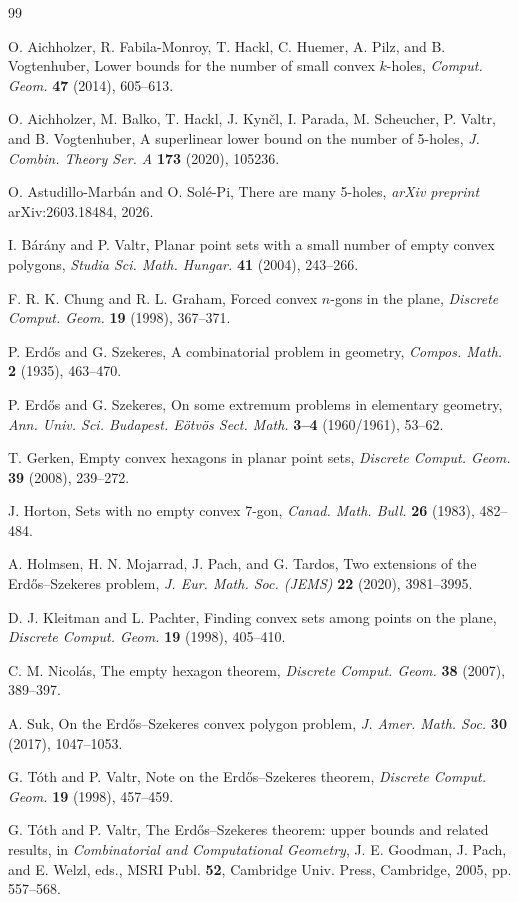 \documentclass[11pt]{article}
\theoremstyle{plain}
\theoremstyle{definition}
\theoremstyle{remark}
\begin{document}
\begin{thebibliography}{99}

O. Aichholzer, R. Fabila-Monroy, T. Hackl, C. Huemer, A. Pilz, and B. Vogtenhuber,
Lower bounds for the number of small convex \(k\)-holes,
\emph{Comput. Geom.} \textbf{47} (2014), 605--613.

O. Aichholzer, M. Balko, T. Hackl, J. Kyn\v{c}l, I. Parada, M. Scheucher, P. Valtr, and B. Vogtenhuber,
A superlinear lower bound on the number of 5-holes,
\emph{J. Combin. Theory Ser. A} \textbf{173} (2020), 105236.

O. Astudillo-Marb\'an and O. Sol\'e-Pi,
There are many 5-holes,
\emph{arXiv preprint} arXiv:2603.18484, 2026.

I. B\'ar\'any and P. Valtr,
Planar point sets with a small number of empty convex polygons,
\emph{Studia Sci. Math. Hungar.} \textbf{41} (2004), 243--266.

F. R. K. Chung and R. L. Graham,
Forced convex \(n\)-gons in the plane,
\emph{Discrete Comput. Geom.} \textbf{19} (1998), 367--371.

P. Erd\H{o}s and G. Szekeres,
A combinatorial problem in geometry,
\emph{Compos. Math.} \textbf{2} (1935), 463--470.

P. Erd\H{o}s and G. Szekeres,
On some extremum problems in elementary geometry,
\emph{Ann. Univ. Sci. Budapest. E\"otv\"os Sect. Math.} \textbf{3--4} (1960/1961), 53--62.

T. Gerken,
Empty convex hexagons in planar point sets,
\emph{Discrete Comput. Geom.} \textbf{39} (2008), 239--272.

J. Horton,
Sets with no empty convex 7-gon,
\emph{Canad. Math. Bull.} \textbf{26} (1983), 482--484.

A. Holmsen, H. N. Mojarrad, J. Pach, and G. Tardos,
Two extensions of the Erd\H{o}s--Szekeres problem,
\emph{J. Eur. Math. Soc. (JEMS)} \textbf{22} (2020), 3981--3995.

D. J. Kleitman and L. Pachter,
Finding convex sets among points on the plane,
\emph{Discrete Comput. Geom.} \textbf{19} (1998), 405--410.

C. M. Nicol\'as,
The empty hexagon theorem,
\emph{Discrete Comput. Geom.} \textbf{38} (2007), 389--397.

A. Suk,
On the Erd\H{o}s--Szekeres convex polygon problem,
\emph{J. Amer. Math. Soc.} \textbf{30} (2017), 1047--1053.

G. T\'oth and P. Valtr,
Note on the Erd\H{o}s--Szekeres theorem,
\emph{Discrete Comput. Geom.} \textbf{19} (1998), 457--459.

G. T\'oth and P. Valtr,
The Erd\H{o}s--Szekeres theorem: upper bounds and related results,
in \emph{Combinatorial and Computational Geometry},
J. E. Goodman, J. Pach, and E. Welzl, eds.,
MSRI Publ. \textbf{52},
Cambridge Univ. Press, Cambridge, 2005, pp. 557--568.


\end{thebibliography}
\end{document}
